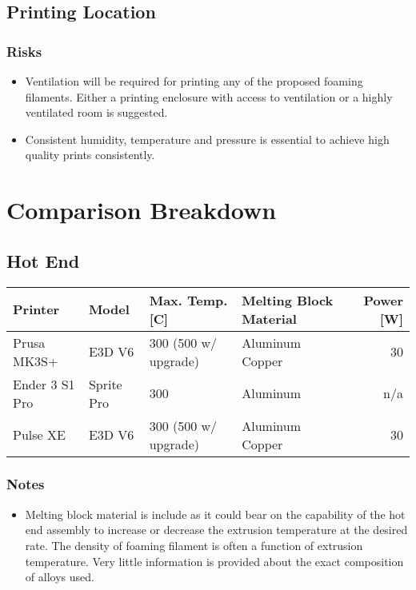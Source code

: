 \documentclass[11pt]{article}
\begin{document}
\subsection{Printing Location}
\label{sec:org14b4306}

\subsubsection{Risks}
\label{sec:orgf9c90c3}
\begin{itemize}
\item Ventilation will be required for printing any of the proposed foaming filaments. Either a printing enclosure with access to ventilation or a highly ventilated room is suggested.
\item Consistent humidity, temperature and pressure is essential to achieve high quality prints consistently.
\end{itemize}

\section{Comparison Breakdown}
\label{sec:orgedb0025}

\subsection{Hot End}
\label{sec:org8fbd0c8}

\begin{center}
\begin{tabular}{llllr}
Printer & Model & Max. Temp. [C] & Melting Block Material & Power [W]\\
\hline
Prusa MK3S+ & E3D V6 & 300 (500 w/ upgrade) & Aluminum Copper & 30\\
Ender 3 S1 Pro & Sprite Pro & 300 & Aluminum & n/a\\
Pulse XE & E3D V6 & 300 (500 w/ upgrade) & Aluminum Copper & 30\\
\end{tabular}
\end{center}

\subsubsection{Notes}
\label{sec:org49c4eb1}
\begin{itemize}
\item Melting block material is include as it could bear on the capability of the hot end assembly to increase or decrease the extrusion temperature at the desired rate. The density of foaming filament is often a function of extrusion temperature. Very little information is provided about the exact composition of alloys used.
\end{itemize}
\end{document}
